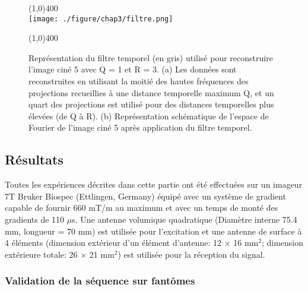 \begin{figure}[H]
\centering \line(1,0){400} \\
\texttt{[image: ./figure/chap3/filtre.png]}
\caption[Filtre temporel]{\label{fig:filtre} Représentation du filtre temporel (en gris) utilisé pour reconstruire l'image ciné 5 avec Q = 1 et R = 3. (a) Les données sont reconstruites en utilisant la moitié des hautes fréquences des projections recueillies à une distance temporelle maximum Q, et un quart des projections est utilisé pour des distances temporelles plus élevées (de Q à R). (b) Représentation schématique de l'espace de Fourier de l'image ciné 5 après application du filtre temporel.}
\line(1,0){400} \\ \end{figure}

\subsection{Résultats}

Toutes les expériences décrites dans cette partie ont été effectuées sur un imageur 7T Bruker Biospec (Ettlingen, Germany) équipé avec un système de gradient capable de fournir 660 mT/m au maximum et avec un temps de monté des gradients de 110 $\mu$s.
Une antenne volumique quadratique (Diamètre interne 75.4 mm, longueur = 70 mm) est utilisée pour l'excitation et une antenne de surface à 4 éléments (dimension extérieur d'un élément d'antenne: 12 $\times$ 16 mm$ ^2$; dimension extérieure totale: 26 $\times$ 21 mm$ ^2$) est utilisée pour la réception du signal.

\subsubsection{Validation de la séquence sur fantômes}

